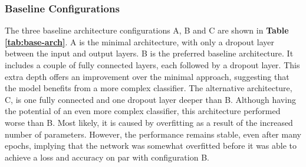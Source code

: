 
\subsubsection{Baseline Configurations}



The three baseline architecture configurations A, B and C are shown in \textbf{Table \ref{tab:base-arch}}. A is the minimal architecture, with only a dropout layer between the input and output layers. B is the preferred baseline architecture. It includes a couple of fully connected layers, each followed by a dropout layer. This extra depth offers an improvement over the minimal approach, suggesting that the model benefits from a more complex classifier. The alternative architecture, C, is one fully connected and one dropout layer deeper than B. Although having the potential of an even more complex classifier, this architecture performed worse than B. Most likely, it is caused by overfitting as a result of the increased number of parameters. However, the performance remains stable, even after many epochs, implying that the network was somewhat overfitted before it was able to achieve a loss and accuracy on par with configuration B.

